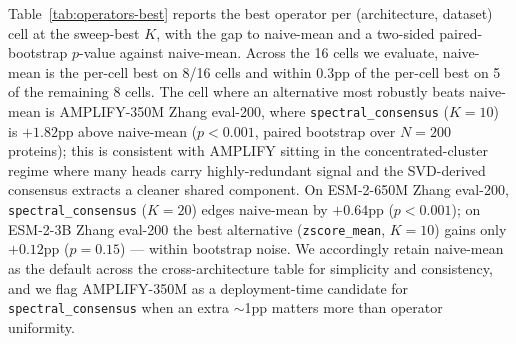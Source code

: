 \documentclass{article}
\begin{document}
Table~\ref{tab:operators-best} reports the best operator per
(architecture, dataset) cell at the sweep-best $K$, with the gap
to naive-mean and a two-sided paired-bootstrap $p$-value against
naive-mean. Across the 16 cells we evaluate, naive-mean is the
per-cell best on 8/16 cells and within $0.3$pp of the per-cell best
on 5 of the remaining 8 cells. The cell where an alternative most
robustly beats naive-mean is AMPLIFY-350M Zhang eval-200, where
\texttt{spectral\_consensus} ($K{=}10$) is $+1.82$pp above
naive-mean ($p{<}0.001$, paired bootstrap over $N{=}200$ proteins);
this is consistent with AMPLIFY sitting in the concentrated-cluster
regime where many heads carry highly-redundant signal and the
SVD-derived consensus extracts a cleaner shared component. On
ESM-2-650M Zhang eval-200, \texttt{spectral\_consensus} ($K{=}20$)
edges naive-mean by $+0.64$pp ($p{<}0.001$); on ESM-2-3B Zhang
eval-200 the best alternative (\texttt{zscore\_mean}, $K{=}10$)
gains only $+0.12$pp ($p{=}0.15$) --- within bootstrap noise. We accordingly retain naive-mean as the default
across the cross-architecture table for simplicity and consistency,
and we flag AMPLIFY-350M as a deployment-time candidate for
\texttt{spectral\_consensus} when an extra $\sim$1pp matters more
than operator uniformity.
\end{document}
